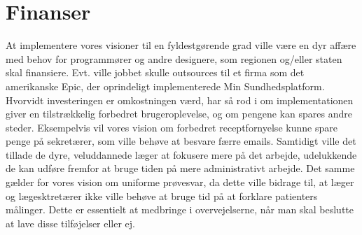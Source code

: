 \section{Finanser}
At implementere vores visioner til en fyldestgørende grad ville være en dyr affære med behov for programmører og andre designere, som regionen og/eller staten skal finansiere. Evt. ville jobbet skulle outsources til et firma som det amerikanske Epic, der oprindeligt implementerede Min Sundhedsplatform. Hvorvidt investeringen er omkostningen værd, har så rod i om implementationen giver en tilstrækkelig forbedret brugeroplevelse, og om pengene kan spares andre steder. Eksempelvis vil vores vision om forbedret receptfornyelse kunne spare penge på sekretærer, som ville behøve at besvare færre emails. Samtidigt ville det tillade de dyre, veluddannede læger at fokusere mere på det arbejde, udelukkende de kan udføre fremfor at bruge tiden på mere administrativt arbejde. Det samme gælder for vores vision om uniforme prøvesvar, da dette ville bidrage til, at læger og lægesktretærer ikke ville behøve at bruge tid på at forklare patienters målinger. Dette er essentielt at medbringe i overvejelserne, når man skal beslutte at lave disse tilføjelser eller ej. 
